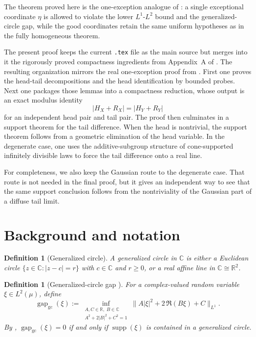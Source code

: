 \documentclass[11pt]{amsart}
\newtheorem{definition}[theorem]{Definition}
\newcommand{\C}{\mathbb{C}}
\newcommand{\R}{\mathbb{R}}
\newcommand{\supp}{\operatorname{supp}}
\newcommand{\gapgc}{\operatorname{gap}_{\mathrm{gc}}}
\begin{document}
The theorem proved here is the one-exception analogue of
\cite[Theorem~2.1]{complex_spr}: a single exceptional coordinate $\eta$ is
allowed to violate the lower $L^1$-$L^2$ bound and the generalized-circle gap,
while the good coordinates retain the same uniform hypotheses as in the fully
homogeneous theorem.

The present proof keeps the current \texttt{.tex} file as the main source but
merges into it the rigorously proved compactness ingredients from
Appendix~A of \cite{complex_spr_app}.  The resulting organization mirrors the
real one-exception proof from \cite{compactness_real}.  First one proves the
head-tail decompositions and the head identification by bounded probes.  Next
one packages those lemmas into a compactness reduction, whose output is an
exact modulus identity
\[
  |H_X+R_X|=|H_Y+R_Y|
\]
for an independent head pair and tail pair.  The proof then culminates in a
support theorem for the tail difference.  When the head is nontrivial, the
support theorem follows from a geometric elimination of the head variable.  In
the degenerate case, one uses the additive-subgroup structure of cone-supported
infinitely divisible laws to force the tail difference onto a real line.

For completeness, we also keep the Gaussian route to the degenerate case.  That
route is not needed in the final proof, but it gives an independent way to see
that the same support conclusion follows from the nontriviality of the Gaussian
part of a diffuse tail limit.

\section{Background and notation}
\label{sec:background}

\begin{definition}[Generalized circle]
A \emph{generalized circle} in $\C$ is either a Euclidean circle
$\{z \in \C : |z-c|=r\}$ with $c \in \C$ and $r \ge 0$, or a real affine line
in $\C \cong \R^2$.
\end{definition}

\begin{definition}[Generalized-circle gap {\cite[Definitions~3.3--3.4]{complex_spr}}]
\label{def:gapgc}
For a complex-valued random variable $\xi \in L^2(\mu)$, define
\[
  \gapgc(\xi)
  :=
  \inf_{\substack{A,C\in\R,\;B\in\C \\ A^2+2|B|^2+C^2=1}}
  \bigl\|A|\xi|^2 + 2\,\Re(B\xi) + C\bigr\|_{L^1}.
\]
By \cite[Lemma~3.8]{complex_spr}, $\gapgc(\xi)=0$ if and only if
$\supp(\xi)$ is contained in a generalized circle.
\end{definition}
\end{document}
